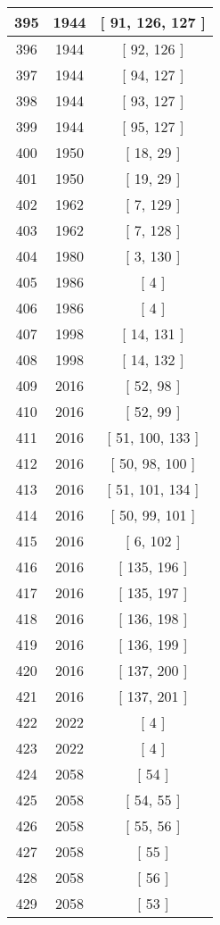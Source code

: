 \begin{center}
\begin{longtable}[H]{|| c c c ||}
\hline
395 & 1944 & [ 91, 126, 127 ] \\ 
\hline
396 & 1944 & [ 92, 126 ] \\ 
\hline
397 & 1944 & [ 94, 127 ] \\ 
\hline
398 & 1944 & [ 93, 127 ] \\ 
\hline
399 & 1944 & [ 95, 127 ] \\ 
\hline
400 & 1950 & [ 18, 29 ] \\ 
\hline
401 & 1950 & [ 19, 29 ] \\ 
\hline
402 & 1962 & [ 7, 129 ] \\ 
\hline
403 & 1962 & [ 7, 128 ] \\ 
\hline
404 & 1980 & [ 3, 130 ] \\ 
\hline
405 & 1986 & [ 4 ] \\ 
\hline
406 & 1986 & [ 4 ] \\ 
\hline
407 & 1998 & [ 14, 131 ] \\ 
\hline
408 & 1998 & [ 14, 132 ] \\ 
\hline
409 & 2016 & [ 52, 98 ] \\ 
\hline
410 & 2016 & [ 52, 99 ] \\ 
\hline
411 & 2016 & [ 51, 100, 133 ] \\ 
\hline
412 & 2016 & [ 50, 98, 100 ] \\ 
\hline
413 & 2016 & [ 51, 101, 134 ] \\ 
\hline
414 & 2016 & [ 50, 99, 101 ] \\ 
\hline
415 & 2016 & [ 6, 102 ] \\ 
\hline
416 & 2016 & [ 135, 196 ] \\ 
\hline
417 & 2016 & [ 135, 197 ] \\ 
\hline
418 & 2016 & [ 136, 198 ] \\ 
\hline
419 & 2016 & [ 136, 199 ] \\ 
\hline
420 & 2016 & [ 137, 200 ] \\ 
\hline
421 & 2016 & [ 137, 201 ] \\ 
\hline
422 & 2022 & [ 4 ] \\ 
\hline
423 & 2022 & [ 4 ] \\ 
\hline
424 & 2058 & [ 54 ] \\ 
\hline
425 & 2058 & [ 54, 55 ] \\ 
\hline
426 & 2058 & [ 55, 56 ] \\ 
\hline
427 & 2058 & [ 55 ] \\ 
\hline
428 & 2058 & [ 56 ] \\ 
\hline
429 & 2058 & [ 53 ] \\ 

\end{longtable}
\end{center}

